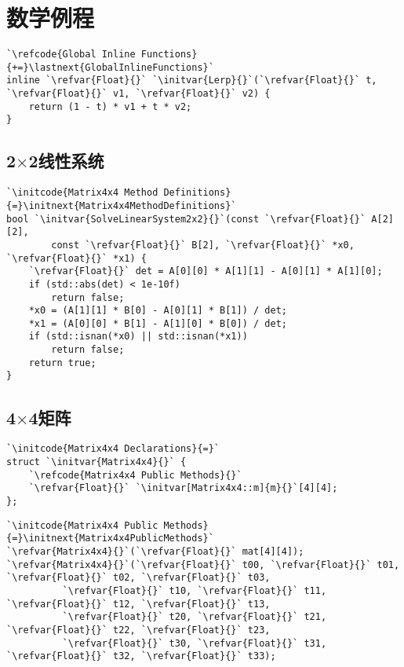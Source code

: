 \section{数学例程}\label{sec:数学例程}

\begin{lstlisting}
`\refcode{Global Inline Functions}{+=}\lastnext{GlobalInlineFunctions}`
inline `\refvar{Float}{}` `\initvar{Lerp}{}`(`\refvar{Float}{}` t, `\refvar{Float}{}` v1, `\refvar{Float}{}` v2) {
    return (1 - t) * v1 + t * v2;
}
\end{lstlisting}

\subsection{2$\times$2线性系统}\label{sub:2x2线性系统}
\begin{lstlisting}
`\initcode{Matrix4x4 Method Definitions}{=}\initnext{Matrix4x4MethodDefinitions}`
bool `\initvar{SolveLinearSystem2x2}{}`(const `\refvar{Float}{}` A[2][2],
        const `\refvar{Float}{}` B[2], `\refvar{Float}{}` *x0, `\refvar{Float}{}` *x1) {
    `\refvar{Float}{}` det = A[0][0] * A[1][1] - A[0][1] * A[1][0];
    if (std::abs(det) < 1e-10f)
        return false;
    *x0 = (A[1][1] * B[0] - A[0][1] * B[1]) / det;
    *x1 = (A[0][0] * B[1] - A[1][0] * B[0]) / det;
    if (std::isnan(*x0) || std::isnan(*x1))
        return false;
    return true;
}
\end{lstlisting}

\subsection{4$\times$4矩阵}\label{sub:4x4矩阵}
\begin{lstlisting}
`\initcode{Matrix4x4 Declarations}{=}`
struct `\initvar{Matrix4x4}{}` {
    `\refcode{Matrix4x4 Public Methods}{}`
    `\refvar{Float}{}` `\initvar[Matrix4x4::m]{m}{}`[4][4];
};
\end{lstlisting}

\begin{lstlisting}
`\initcode{Matrix4x4 Public Methods}{=}\initnext{Matrix4x4PublicMethods}`
`\refvar{Matrix4x4}{}`(`\refvar{Float}{}` mat[4][4]);
`\refvar{Matrix4x4}{}`(`\refvar{Float}{}` t00, `\refvar{Float}{}` t01, `\refvar{Float}{}` t02, `\refvar{Float}{}` t03,
          `\refvar{Float}{}` t10, `\refvar{Float}{}` t11, `\refvar{Float}{}` t12, `\refvar{Float}{}` t13,
          `\refvar{Float}{}` t20, `\refvar{Float}{}` t21, `\refvar{Float}{}` t22, `\refvar{Float}{}` t23,
          `\refvar{Float}{}` t30, `\refvar{Float}{}` t31, `\refvar{Float}{}` t32, `\refvar{Float}{}` t33);
\end{lstlisting}

